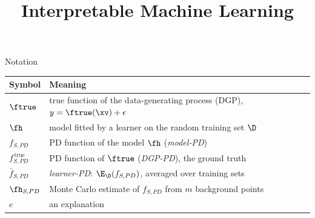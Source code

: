 \documentclass[10pt,compress,t,notes=noshow, xcolor=table]{beamer}
\title{Interpretable Machine Learning}
\newcommand{\fpdtrue}[1]{f^{\,\text{true}}_{#1,PD}}  %
\newcommand{\fpdbar}[1]{\bar{f}_{#1,PD}}             %
\begin{document}





\begin{framev}[align=mid]{Notation}
\small
\renewcommand{\arraystretch}{1.25}
\begin{tabular}{@{}>{\raggedright\arraybackslash}p{}>{\raggedright\arraybackslash}p{}@{}}
\toprule
Symbol & Meaning \\
\midrule
$\ftrue$        & true function of the data-generating process (DGP), $y = \ftrue(\xv) + \epsilon$ \\
$\fh$           & model fitted by a learner on the random training set $\D$ \\
$f_{S,PD}$      & PD function of the model $\fh$ (\emph{model-PD}) \\
$\fpdtrue{S}$   & PD function of $\ftrue$ (\emph{DGP-PD}), the ground truth \\
$\fpdbar{S}$    & \emph{learner-PD}: $\E_{\D}(f_{S,PD})$, averaged over training sets \\
$\fh_{S,PD}$    & Monte Carlo estimate of $f_{S,PD}$ from $m$ background points \\
$e$             & an explanation\\
\bottomrule
\end{tabular}
\end{framev}
\end{document}
